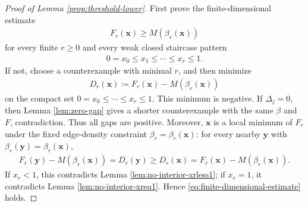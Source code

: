 \documentclass[10pt,a4paper]{article}
\begin{document}
\begin{proof}[Proof of Lemma \ref{prop:threshold-lower}]
First prove the finite-dimensional estimate
\begin{align}\label{eq:finite-dimensional-estimate}
  F_r(\mathbf{x})\ge M(\beta_r(\mathbf{x}))
\end{align}
for every finite $r\ge0$ and every weak closed staircase pattern
\begin{align*}
  0=x_0\le x_1\le\cdots\le x_r\le1.
\end{align*}
If not, choose a counterexample with minimal $r$, and then minimize
\begin{align*}
  D_r(\mathbf{x})\coloneqq F_r(\mathbf{x})-M(\beta_r(\mathbf{x}))
\end{align*}
on the compact set $0=x_0\le\cdots\le x_r\le1$.  This minimum is negative.  If $\Delta_j=0$, then Lemma \ref{lem:zero-gap} gives a shorter counterexample with the same $\beta$ and $F$, contradiction.  Thus all gaps are positive.  Moreover, $\mathbf{x}$ is a local minimum of $F_r$ under the fixed edge-density constraint $\beta_r=\beta_r(\mathbf{x})$: for every nearby $\mathbf{y}$ with $\beta_r(\mathbf{y})=\beta_r(\mathbf{x})$,
\begin{align*}
  F_r(\mathbf{y})-M(\beta_r(\mathbf{x}))=D_r(\mathbf{y})\ge D_r(\mathbf{x})=F_r(\mathbf{x})-M(\beta_r(\mathbf{x})).
\end{align*}
If $x_r<1$, this contradicts Lemma \ref{lem:no-interior-xrless1}; if $x_r=1$, it contradicts Lemma \ref{lem:no-interior-xreq1}.  Hence \eqref{eq:finite-dimensional-estimate} holds.


\end{proof}
\end{document}
